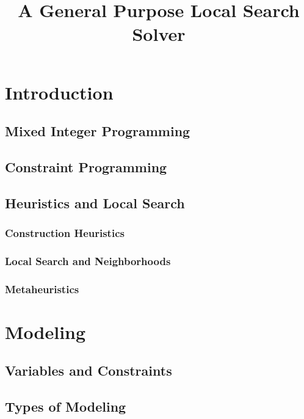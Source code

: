 \documentclass[a4paper,10pt]{article}
\title{A General Purpose Local Search Solver}
\begin{document}
\maketitle

\tableofcontents
\newpage
\section{Introduction}
\subsection{Mixed Integer Programming}
\subsection{Constraint Programming}
\subsection{Heuristics and Local Search}
\subsubsection{Construction Heuristics}
\subsubsection{Local Search and Neighborhoods}
\subsubsection{Metaheuristics}

\section{Modeling}

\subsection{Variables and Constraints}

\subsection{Types of Modeling}

\end{document}
